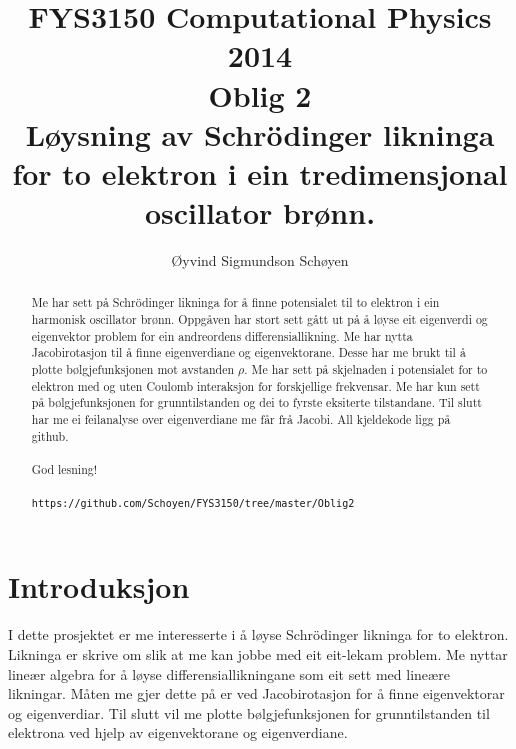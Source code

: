 \documentclass[11pt, a4paper]{article}
\begin{document}
\begin{titlepage}

  \title{\normalsize FYS3150 Computational Physics 2014\\
  \vspace{10mm}
  \huge Oblig 2\\
  \vspace{10mm}
  \normalsize {\bf Løysning av Schrödinger likninga for to elektron i ein tredimensjonal oscillator brønn.}}

  \author{Øyvind Sigmundson Schøyen}

\end{titlepage}

\maketitle

\newpage
\begin{abstract}
  Me har sett på Schrödinger likninga for å finne potensialet til to elektron i ein harmonisk oscillator brønn. Oppgåven har stort sett gått ut på å løyse 
  eit eigenverdi og eigenvektor problem for ein andreordens differensiallikning. Me har nytta Jacobirotasjon til å finne eigenverdiane og eigenvektorane. 
  Desse har me brukt til å plotte bølgjefunksjonen mot avstanden $\rho$. Me har sett på skjelnaden i potensialet for to elektron med og uten Coulomb interaksjon for 
  forskjellige frekvensar. Me har kun sett på bølgjefunksjonen for grunntilstanden og dei to fyrste eksiterte tilstandane. Til slutt har me ei feilanalyse over eigenverdiane 
  me får frå Jacobi. All kjeldekode ligg på github. \\ \\
  God lesning! \\ \\
  \texttt{https://github.com/Schoyen/FYS3150/tree/master/Oblig2}
\end{abstract}

\newpage
  \tableofcontents
\newpage

\section{Introduksjon}
  I dette prosjektet er me interesserte i å løyse Schrödinger likninga for to elektron. Likninga er skrive om slik at me kan jobbe med eit eit-lekam problem.
  Me nyttar lineær algebra for å løyse differensiallikningane som eit sett med lineære likningar. Måten me gjer dette på er ved Jacobirotasjon 
  for å finne eigenvektorar og eigenverdiar. Til slutt vil me plotte bølgjefunksjonen for grunntilstanden til elektrona ved hjelp av eigenvektorane og 
  eigenverdiane.
\end{document}
